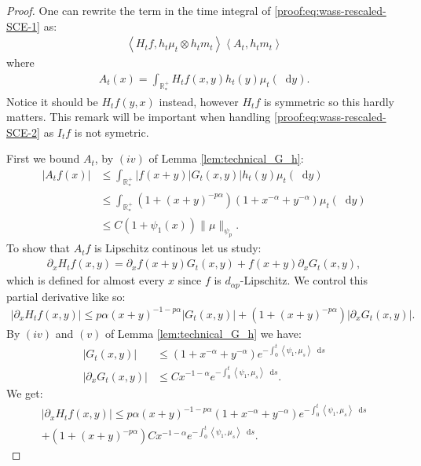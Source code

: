 \documentclass[11pt,a4paper]{article}
\newcommand{\RRP}{\mathbb{R}^+_*}
\newcommand{\brac}[1]{\left\langle#1\right\rangle}
\newcommand{\dd}{\mathop{}\!\mathrm{d}}
\begin{document}
\begin{proof}
    One can rewrite the term in the time integral of \eqref{proof:eq:wass-rescaled-SCE-1} as:
    \begin{align*}
        \brac{H_tf,h_t\mu_t \otimes h_t m_t} \brac{A_t,h_t m_t}
    \end{align*}
    where
    \begin{align*}
        A_t(x) = \int_{\RRP} H_tf(x,y) h_t(y) \mu_t(\dd y).
    \end{align*}    
    Notice it should be $H_tf(y,x)$ instead, however $H_tf$ is symmetric so this hardly matters. This remark will be important when handling \eqref{proof:eq:wass-rescaled-SCE-2} as $I_tf$ is not symetric. 
    
    First we bound $A_t$, by $(iv)$ of Lemma \ref{lem:technical_G_h}:
    \begin{align*}
        \left|A_tf(x)\right| &\leq \int_{\RRP} |f(x+y)|G_t(x,y)| h_t(y)\mu_t(\dd y)\\
        &\leq \int_{\RRP} (1 + (x+y)^{-p\alpha})(1 +x^{-\alpha} +y^{-\alpha})  \mu_t(\dd y) \\
        &\leq C(1 + \psi_1(x)) \| \mu\|_{\psi_{p}}.
    \end{align*}
    To show that  $A_tf$ is Lipschitz continous let us study:
    \begin{align*}
        \partial_x H_tf(x,y) = \partial_x f(x+y) G_t(x,y) + f(x+y) \partial_x G_t(x,y),
    \end{align*}
    which is defined for almost every $x$ since $f$ is $d_{\alpha p}$-Lipschitz. We control this partial derivative like so:
    \begin{align*}
        \left|\partial_x H_tf(x,y) \right| \leq p\alpha (x+y)^{-1-p\alpha} \left|G_t(x,y) \right| + \left( 1 + (x+y)^{-p\alpha} \right) \left|\partial_x G_t(x,y) \right|.
    \end{align*}
    By $(iv)$ and $(v)$ of Lemma \ref{lem:technical_G_h} we have:
    \begin{align*}
        \left|G_t(x,y) \right| &\leq (1 + x^{-\alpha} + y^{-\alpha}) e^{-\int_0^t \brac{\psi_1,\mu_s}\dd s} \\
        \left|\partial_x G_t(x,y) \right| &\leq  C x^{-1-\alpha} e^{-\int_0^t \brac{\psi_1,\mu_s}\dd s}.
    \end{align*}
    We get:
    \begin{multline*}
        \left|\partial_x H_tf(x,y) \right| \leq p\alpha (x+y)^{-1-p\alpha} (1 + x^{-\alpha} + y^{-\alpha})e^{-\int_0^t \brac{\psi_1,\mu_s}\dd s} \\
        +  \left( 1 + (x+y)^{-p\alpha} \right)C x^{-1-\alpha}e^{-\int_0^t \brac{\psi_1,\mu_s}\dd s}.

\end{multline*}
\end{proof}
\end{document}

